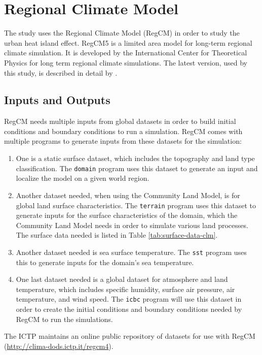 \section{Regional Climate Model}
	The study uses the Regional Climate Model (RegCM) in order to study the urban heat island effect.
	RegCM5 is a limited area model for long-term regional climate simulation.
	It is developed by the International Center for Theoretical Physics for long term regional climate
	simulations.
	The latest version, used by this study, is described in detail by \textcite{Giorgi2023}.
	
	\subsection{Inputs and Outputs}
		RegCM needs multiple inputs from global datasets in order to build initial conditions and boundary conditions to run a simulation. RegCM comes with multiple programs to generate inputs from these datasets for the simulation:
		\begin{enumerate}
			\item One is a static surface dataset, which includes the topography and land type classification. 
				The \texttt{domain} program uses this dataset to generate an input and localize the model on a given world region.
			\item Another dataset needed, when using the Community Land Model, is for global land surface characteristics.
				The \texttt{terrain} program uses this dataset to generate inputs for the surface characteristics of the domain, which the Community Land Model needs in order to simulate various land processes.
				The surface data needed is listed in Table \ref{tab:surface-data-clm}.
			\item Another dataset needed is sea surface temperature.
				The \texttt{sst} program uses this to generate inputs for the domain's sea temperature.
			\item One last dataset needed is a global dataset for atmosphere and land temperature, which includes specific humidity, surface air pressure, air temperature, and wind speed.
				The \texttt{icbc} program will use this dataset in order to create the initial conditions and boundary conditions needed by RegCM to run the simulations.
		\end{enumerate}
		The ICTP maintains an online public repository of datasets for use with RegCM (\url{http://clima-dods.ictp.it/regcm4}).
		
